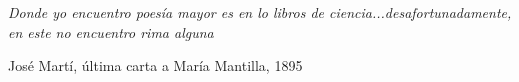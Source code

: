 
\begin{dedication}

\vspace*{1cm}

\bigskip
\bigskip

\slshape{\vspace{0.5cm}
	Donde yo encuentro poesía mayor es en lo libros de ciencia...desafortunadamente, en este no encuentro rima alguna
}

\smallskip
	José Martí, última carta a María Mantilla, 1895
\end{dedication}
